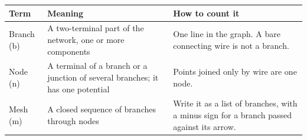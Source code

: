 \documentclass[11pt]{article}
\begin{document}
\begin{keepsection}
\begin{keepsection}
\begin{center}\small\begin{tabularx}{\linewidth}{>{\raggedright\arraybackslash}X>{\raggedright\arraybackslash}X>{\raggedright\arraybackslash}X}\toprule
\textbf{Term} & \textbf{Meaning} & \textbf{How to count it} \\ \midrule
Branch (b) & A two-terminal part of the network, one or more components & One line in the graph. A bare connecting wire is not a branch. \\
Node (n) & A terminal of a branch or a junction of several branches; it has one potential & Points joined only by wire are one node. \\
Mesh (m) & A closed sequence of branches through nodes & Write it as a list of branches, with a minus sign for a branch passed against its arrow. \\
\bottomrule\end{tabularx}\end{center}


\end{keepsection}
\end{keepsection}
\end{document}
